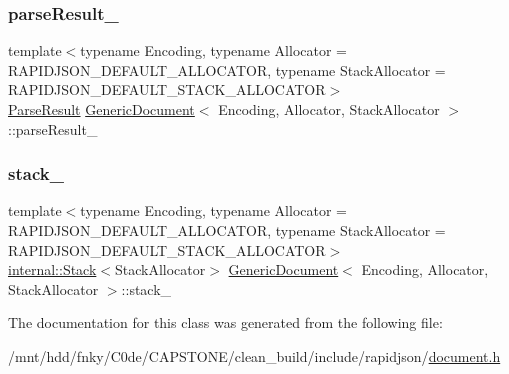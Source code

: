 \mbox{\label{classGenericDocument_a499058f1c615928337d96cfaf374373e}} 
\subsubsection{\texorpdfstring{parse\+Result\+\_\+}{parseResult\_}}
{\footnotesize\ttfamily template$<$typename Encoding, typename Allocator = R\+A\+P\+I\+D\+J\+S\+O\+N\+\_\+\+D\+E\+F\+A\+U\+L\+T\+\_\+\+A\+L\+L\+O\+C\+A\+T\+OR, typename Stack\+Allocator = R\+A\+P\+I\+D\+J\+S\+O\+N\+\_\+\+D\+E\+F\+A\+U\+L\+T\+\_\+\+S\+T\+A\+C\+K\+\_\+\+A\+L\+L\+O\+C\+A\+T\+OR$>$ \\
\hyperlink{structParseResult}{Parse\+Result} \hyperlink{classGenericDocument}{Generic\+Document}$<$ Encoding, Allocator, Stack\+Allocator $>$\+::parse\+Result\+\_\+\hspace{0.3cm}{\ttfamily [private]}}

\mbox{\label{classGenericDocument_ad2169359326bdf8a7180338fec77e77f}} 
\subsubsection{\texorpdfstring{stack\+\_\+}{stack\_}}
{\footnotesize\ttfamily template$<$typename Encoding, typename Allocator = R\+A\+P\+I\+D\+J\+S\+O\+N\+\_\+\+D\+E\+F\+A\+U\+L\+T\+\_\+\+A\+L\+L\+O\+C\+A\+T\+OR, typename Stack\+Allocator = R\+A\+P\+I\+D\+J\+S\+O\+N\+\_\+\+D\+E\+F\+A\+U\+L\+T\+\_\+\+S\+T\+A\+C\+K\+\_\+\+A\+L\+L\+O\+C\+A\+T\+OR$>$ \\
\hyperlink{classinternal_1_1Stack}{internal\+::\+Stack}$<$Stack\+Allocator$>$ \hyperlink{classGenericDocument}{Generic\+Document}$<$ Encoding, Allocator, Stack\+Allocator $>$\+::stack\+\_\+\hspace{0.3cm}{\ttfamily [private]}}



The documentation for this class was generated from the following file\+:\begin{DoxyCompactItemize}
\item 
/mnt/hdd/fnky/\+C0de/\+C\+A\+P\+S\+T\+O\+N\+E/clean\+\_\+build/include/rapidjson/\hyperlink{document_8h}{document.\+h}\end{DoxyCompactItemize}
